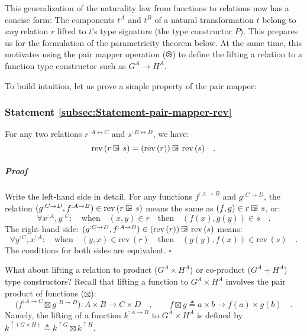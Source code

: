 This generalization of the naturality law from functions to relations
now has a concise form: The components $t^{A}$ and $t^{B}$ of a
natural transformation $t$ belong to \emph{any} relation $r$ lifted
to $t$\textsf{'}s type signature (the type constructor $P$). This prepares
us for the formulation of the parametricity theorem below. At the
same time, this motivates using the pair mapper operation ($\ogreaterthan$)
to define the lifting a relation to a function type constructor such
as $G^{A}\rightarrow H^{A}$.

To build intuition, let us prove a simple property of the pair mapper:

\subsubsection{Statement \label{subsec:Statement-pair-mapper-rev}\ref{subsec:Statement-pair-mapper-rev}}

For any two relations $r^{:A\leftrightarrow C}$ and $s^{:B\leftrightarrow D}$,
we have:
\[
\text{rev}\,(r\varogreaterthan s)=(\text{rev}\,(r))\varogreaterthan\text{rev}\,(s)\quad.
\]


\subparagraph{Proof}

Write the left-hand side in detail. For any functions $f^{:A\rightarrow B}$
and $g^{:C\rightarrow D}$, the relation $(g^{:C\rightarrow D},f^{:A\rightarrow B})\in\text{rev}\,(r\varogreaterthan s)$
means the same as $(f,g)\in r\varogreaterthan s$, or:
\[
\forall x^{:A},y^{:C}:\quad\text{when}\quad(x,y)\in r\quad\text{then}\quad(f(x),g(y))\in s\quad.
\]
The right-hand side: $(g^{:C\rightarrow D},f^{:A\rightarrow B})\in(\text{rev}\,(r))\varogreaterthan\text{rev}\,(s)$
means:
\[
\forall y^{:C},x^{:A}:\quad\text{when}\quad(y,x)\in\text{rev}\,(r)\quad\text{then}\quad(g(y),f(x))\in\text{rev}\,(s)\quad.
\]
The conditions for both sides are equivalent. $\square$ 

What about lifting a relation to product ($G^{A}\times H^{A}$) or
co-product ($G^{A}+H^{A}$) type constructors? Recall that lifting
a function to $G^{A}\times H^{A}$ involves the pair product of functions
($\boxtimes$):
\[
\big(f^{:A\rightarrow C}\boxtimes g^{:B\rightarrow D}\big):A\times B\rightarrow C\times D\quad,\quad\quad f\boxtimes g\triangleq a\times b\rightarrow f(a)\times g(b)\quad.
\]
Namely, the lifting of a function $k^{:A\rightarrow B}$ to $G^{A}\times H^{A}$
is defined by $k^{\uparrow(G\times H)}\triangleq k^{\uparrow G}\boxtimes k^{\uparrow H}$. 


